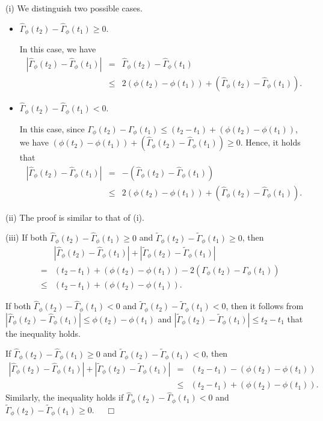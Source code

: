 \documentclass[12pt]{article}
\renewenvironment{proof}{\noindent{\bf Proof.}}{~~$\Box$}
\theoremstyle{plain}
\theoremstyle{definition}
\begin{document}
\begin{proof}
(i) We distinguish two possible cases.
\begin{itemize}%
\item[\rm (a)] $\hat{\Gamma}_\phi(t_2)-\hat{\Gamma}_\phi(t_1)\geq 0$.

In this case, we have
\begin{eqnarray*}
|\hat{\Gamma}_\phi(t_2)-\hat{\Gamma}_\phi(t_1)|
&=&\hat{\Gamma}_\phi(t_2)-\hat{\Gamma}_\phi(t_1)\\
&\leq& 2(\phi(t_2)-\phi(t_1))+(\hat{\Gamma}_\phi(t_2)-\hat{\Gamma}_\phi(t_1)).
\end{eqnarray*}

\item[\rm (b)] $\hat{\Gamma}_\phi(t_2)-\hat{\Gamma}_\phi(t_1)<0$.

In this case, since $\Gamma_\phi(t_2)-\Gamma_\phi(t_1)\leq (t_2-t_1)+(\phi(t_2)-\phi(t_1))$, we have
$(\phi(t_2)-\phi(t_1))+(\hat{\Gamma}_\phi(t_2)-\hat{\Gamma}_\phi(t_1))\geq 0$. Hence, it holds that
\begin{eqnarray*}
|\hat{\Gamma}_\phi(t_2)-\hat{\Gamma}_\phi(t_1)|
&=&-(\hat{\Gamma}_\phi(t_2)-\hat{\Gamma}_\phi(t_1))\\
&\leq& 2(\phi(t_2)-\phi(t_1))+(\hat{\Gamma}_\phi(t_2)-\hat{\Gamma}_\phi(t_1)).
\end{eqnarray*}
\end{itemize}

(ii) The proof is similar to that of (i).

(iii) If both $\hat{\Gamma}_\phi(t_2)-\hat{\Gamma}_\phi(t_1)\geq 0$ and $\tilde{\Gamma}_\phi(t_2)-\tilde{\Gamma}_\phi(t_1)\geq 0$, then
\begin{eqnarray*}
&&|\hat{\Gamma}_\phi(t_2)-\hat{\Gamma}_\phi(t_1)|+|\tilde{\Gamma}_\phi(t_2)-\tilde{\Gamma}_\phi(t_1)|\\
&=&(t_2-t_1)+(\phi(t_2)-\phi(t_1))-2(\Gamma_\phi(t_2)-\Gamma_\phi(t_1))\\
&\leq& (t_2-t_1)+(\phi(t_2)-\phi(t_1)).
\end{eqnarray*}

If both $\hat{\Gamma}_\phi(t_2)-\hat{\Gamma}_\phi(t_1)< 0$ and $\tilde{\Gamma}_\phi(t_2)-\tilde{\Gamma}_\phi(t_1)< 0$, then it follows from $|\hat{\Gamma}_\phi(t_2)-\hat{\Gamma}_\phi(t_1)|\leq \phi(t_2)-\phi(t_1)$ and $|\tilde{\Gamma}_\phi(t_2)-\tilde{\Gamma}_\phi(t_1)|\leq t_2-t_1$ that the inequality holds.

If $\hat{\Gamma}_\phi(t_2)-\hat{\Gamma}_\phi(t_1)\geq 0$ and $\tilde{\Gamma}_\phi(t_2)-\tilde{\Gamma}_\phi(t_1)< 0$, then
\begin{eqnarray*}
|\hat{\Gamma}_\phi(t_2)-\hat{\Gamma}_\phi(t_1)|+|\tilde{\Gamma}_\phi(t_2)-\tilde{\Gamma}_\phi(t_1)|
&=& (t_2-t_1)-(\phi(t_2)-\phi(t_1))\\
&\leq& (t_2-t_1)+(\phi(t_2)-\phi(t_1)).
\end{eqnarray*}
Similarly, the inequality holds if $\hat{\Gamma}_\phi(t_2)-\hat{\Gamma}_\phi(t_1)<0$ and $\tilde{\Gamma}_\phi(t_2)-\tilde{\Gamma}_\phi(t_1)\geq 0$.
\end{proof}
\end{document}
